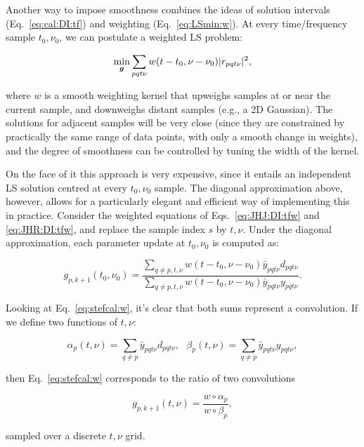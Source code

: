 \documentclass[useAMS,usenatbib]{mn2e}
\begin{document}
Another way to impose smoothness combines the ideas of solution intervals  (Eq.~\ref{eq:cal:DI:tf}) 
and weighting (Eq.~\ref{eq:LSmin:w}). At every time/frequency sample $t_0,\nu_0$, we can postulate a weighted 
LS problem:

\begin{equation}
\label{eq:cal:DI:smooth}
\min_{\bmath{g}}\sum_{pqt\nu}w(t-t_0,\nu-\nu_0)|r_{pqt\nu}|^2, 
\end{equation}

where $w$ is a smooth weighting kernel that upweighs samples at or near the current sample, and downweighs distant 
samples (e.g., a 2D Gaussian). The solutions for adjacent samples will be very close (since they 
are constrained by practically the same range of data points, with only a smooth change in weights), and the 
degree of smoothness can be controlled by tuning the width of the kernel.

On the face of it this approach is very expensive, since it entails an independent LS solution centred at 
every $t_0,\nu_0$ sample. The diagonal approximation above, however, allows for a particularly elegant and efficient way of 
implementing this in practice. Consider the weighted equations of Eqs.~\ref{eq:JHJ:DI:tfw} and \ref{eq:JHR:DI:tfw}, 
and replace the sample index $s$ by $t,\nu$. Under the diagonal approximation, each parameter update at $t_0,\nu_0$ is 
computed as:

\begin{equation}
\label{eq:stefcal:w}
g_{p,{k+1}}(t_0,\nu_0) = \frac{\sum\limits_{q\ne p,t,\nu} w(t-t_0,\nu-\nu_0) \bar{y}_{pqt\nu} d_{pqt\nu} }
{\sum\limits_{q\ne p,t,\nu} w(t-t_0,\nu-\nu_0) \bar{y}_{pqt\nu} y_{pqt\nu}}.
\end{equation}

Looking at Eq.~\ref{eq:stefcal:w}, it's clear that both sums represent a convolution. If we define two functions of $t,\nu$:

\[
\alpha_p(t,\nu) = \sum\limits_{q\ne p} \bar{y}_{pqt\nu} d_{pqt\nu},~~~
\beta_p(t,\nu) = \sum\limits_{q\ne p} \bar{y}_{pqt\nu} y_{pqt\nu},
\]

then Eq.~\ref{eq:stefcal:w} corresponds to the ratio of two convolutions

\begin{equation}
\label{eq:JHJ:diag:smooth}
g_{p,k+1}(t,\nu) = \frac{w\circ \alpha_p}{w\circ\beta_p},
\end{equation}

sampled over a discrete $t,\nu$ grid.
\end{document}
